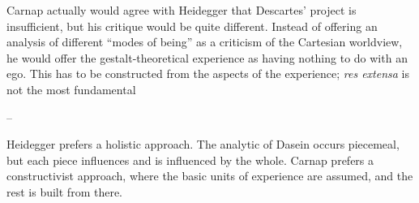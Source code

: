 \documentclass[leqno, 12pt]{turabian-researchpaper}
\begin{document}
	Carnap actually would agree with Heidegger that Descartes' project is
	insufficient, but his critique would be quite different. Instead of offering
	an analysis of different \enquote{modes of being} as a criticism of the Cartesian
	worldview, he would offer the gestalt-theoretical experience as having nothing
	to do with an ego. This has to be constructed from the aspects of the experience;
	\textit{res extensa} is not the most fundamental

	--

	Heidegger prefers a holistic approach. The analytic of Dasein occurs piecemeal,
	but each piece influences and is influenced by the whole. Carnap prefers a constructivist
	approach, where the basic units of experience are assumed, and the rest is built
	from there.




\end{document}
